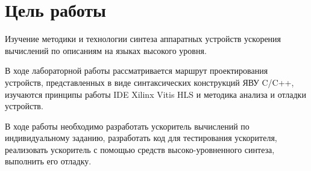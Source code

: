 \setcounter{page}{2}

\chapter*{Цель работы}


Изучение методики и технологии синтеза аппаратных устройств ускорения вычислений по описаниям на языках высокого уровня. 

В ходе лабораторной работы рассматривается маршрут проектирования устройств, представленных в виде синтаксических конструкций ЯВУ C/C++, изучаются принципы работы IDE Xilinx Vitis HLS и методика анализа и отладки устройств.

 В ходе работы необходимо разработать ускоритель вычислений по индивидуальному заданию, разработать код для тестирования ускорителя, реализовать ускоритель с помощью средств высоко-уровненного синтеза, выполнить его отладку.


